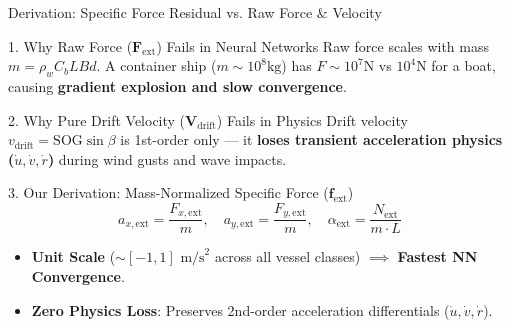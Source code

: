\documentclass[t]{beamer}
\begin{document}
\begin{frame}{Derivation: Specific Force Residual vs. Raw Force \& Velocity}
    \begin{block}{1. Why Raw Force ($\mathbf{F}_{\mathrm{ext}}$) Fails in Neural Networks}
        Raw force scales with mass $m = \rho_w C_b L B d$. A container ship ($m \sim 10^8\text{kg}$) has $F \sim 10^7\text{N}$ vs $10^4\text{N}$ for a boat, causing \textbf{gradient explosion and slow convergence}.
    \end{block}

    \begin{block}{2. Why Pure Drift Velocity ($\mathbf{V}_{\mathrm{drift}}$) Fails in Physics}
        Drift velocity $v_{\mathrm{drift}} = \mathrm{SOG} \sin\beta$ is 1st-order only — it \textbf{loses transient acceleration physics ($\dot{u}, \dot{v}, \dot{r}$)} during wind gusts and wave impacts.
    \end{block}

    \begin{block}{3. Our Derivation: Mass-Normalized Specific Force ($\mathbf{f}_{\mathrm{ext}}$)}
        $$a_{x,\mathrm{ext}} = \frac{F_{x,\mathrm{ext}}}{m}, \quad a_{y,\mathrm{ext}} = \frac{F_{y,\mathrm{ext}}}{m}, \quad \alpha_{\mathrm{ext}} = \frac{N_{\mathrm{ext}}}{m \cdot L}$$
        \begin{itemize}
            \item \textbf{Unit Scale} ($\sim [-1, 1]\text{ m/s}^2$ across all vessel classes) $\implies$ \textbf{Fastest NN Convergence}.
            \item \textbf{Zero Physics Loss}: Preserves 2nd-order acceleration differentials ($\dot{u}, \dot{v}, \dot{r}$).
        \end{itemize}
    \end{block}
\end{frame}
\end{document}
